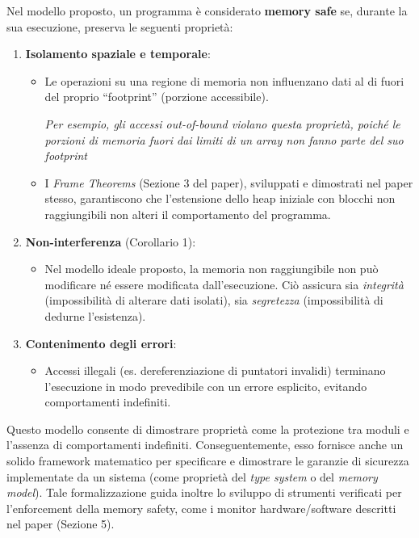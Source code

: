 Nel modello proposto, un programma è considerato \textbf{memory safe} se, durante
la sua esecuzione, preserva le seguenti proprietà:
\begin{enumerate}
  \item \textbf{Isolamento spaziale e temporale}:
    \begin{itemize}
      \item Le operazioni su una regione di memoria non influenzano dati al di fuori
        del proprio ``footprint'' (porzione accessibile).

        \textit{Per esempio, gli accessi out-of-bound violano questa proprietà,
        poiché le porzioni di memoria fuori dai limiti di un array non fanno
        parte del suo footprint}

      \item I \textit{Frame Theorems} (Sezione 3 del paper), sviluppati e dimostrati
        nel paper stesso, garantiscono che l'estensione dello heap iniziale con
        blocchi non raggiungibili non alteri il comportamento del programma.
    \end{itemize}

  \item \textbf{Non-interferenza} (Corollario 1):
    \begin{itemize}
      \item Nel modello ideale proposto, la memoria non raggiungibile non può
        modificare né essere modificata dall'esecuzione. Ciò assicura sia \textit{integrità}
        (impossibilità di alterare dati isolati), sia \textit{segretezza} (impossibilità
        di dedurne l'esistenza).
    \end{itemize}

  \item \textbf{Contenimento degli errori}:
    \begin{itemize}
      \item Accessi illegali (es. dereferenziazione di puntatori invalidi)
        terminano l'esecuzione in modo prevedibile con un errore esplicito, evitando
        comportamenti indefiniti.
    \end{itemize}
\end{enumerate}

Questo modello consente di dimostrare proprietà come la protezione tra moduli e
l'assenza di comportamenti indefiniti. Conseguentemente, esso fornisce anche un
solido framework matematico per specificare e dimostrare le garanzie di
sicurezza implementate da un sistema (come proprietà del \textit{type system} o
del \textit{memory model}). Tale formalizzazione guida inoltre lo sviluppo di strumenti
verificati per l'enforcement della memory safety, come i monitor hardware/software
descritti nel paper (Sezione 5).

